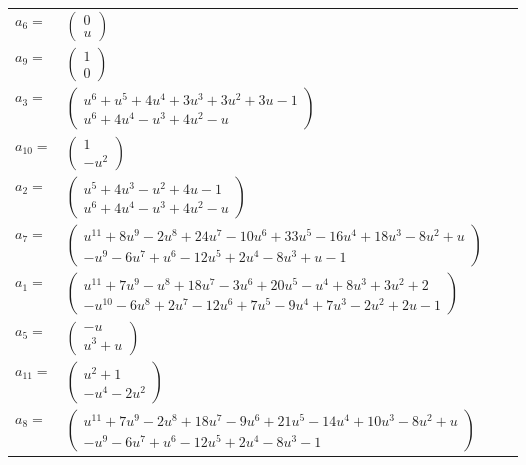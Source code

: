 \documentclass[1p]{elsarticle_modified}
\theoremstyle{definition}
\begin{document}
\begin{tabular}{m{7pt} m{180pt} m{7pt} m{180pt} }
\flushright $a_{6}=$&$\begin{pmatrix}0\\u\end{pmatrix}$ \\
\flushright $a_{9}=$&$\begin{pmatrix}1\\0\end{pmatrix}$ \\
\flushright $a_{3}=$&$\begin{pmatrix}u^6+u^5+4 u^4+3 u^3+3 u^2+3 u-1\\u^6+4 u^4- u^3+4 u^2- u\end{pmatrix}$ \\
\flushright $a_{10}=$&$\begin{pmatrix}1\\- u^2\end{pmatrix}$ \\
\flushright $a_{2}=$&$\begin{pmatrix}u^5+4 u^3- u^2+4 u-1\\u^6+4 u^4- u^3+4 u^2- u\end{pmatrix}$ \\
\flushright $a_{7}=$&$\begin{pmatrix}u^{11}+8 u^9-2 u^8+24 u^7-10 u^6+33 u^5-16 u^4+18 u^3-8 u^2+u\\- u^9-6 u^7+u^6-12 u^5+2 u^4-8 u^3+u-1\end{pmatrix}$ \\
\flushright $a_{1}=$&$\begin{pmatrix}u^{11}+7 u^9- u^8+18 u^7-3 u^6+20 u^5- u^4+8 u^3+3 u^2+2\\- u^{10}-6 u^8+2 u^7-12 u^6+7 u^5-9 u^4+7 u^3-2 u^2+2 u-1\end{pmatrix}$ \\
\flushright $a_{5}=$&$\begin{pmatrix}- u\\u^3+u\end{pmatrix}$ \\
\flushright $a_{11}=$&$\begin{pmatrix}u^2+1\\- u^4-2 u^2\end{pmatrix}$ \\
\flushright $a_{8}=$&$\begin{pmatrix}u^{11}+7 u^9-2 u^8+18 u^7-9 u^6+21 u^5-14 u^4+10 u^3-8 u^2+u\\- u^9-6 u^7+u^6-12 u^5+2 u^4-8 u^3-1\end{pmatrix}$ \\

\end{tabular}
\end{document}
